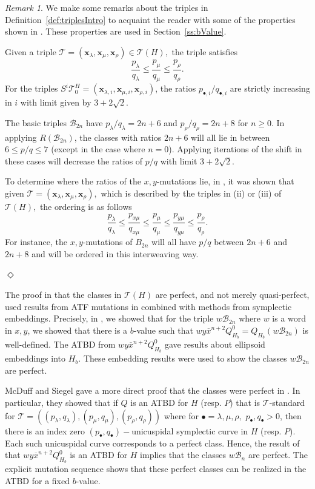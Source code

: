 \documentclass[11pt, reqno]{amsart}
\theoremstyle{remark}
\numberwithin{equation}{subsection}
\numberwithin{figure}{section}
\theoremstyle{customremark}
\newtheorem{rmk_no_diamond}[thm]{Remark}
\newenvironment{rmk}{\begin{rmk_no_diamond} } {\hfill$\er$ \end{rmk_no_diamond}}
\newcommand{\Tt}{\mathcal{T}}
\newcommand{\ov}{\overline}
\newcommand{\la}{{\lambda}}
\newcommand{\er}{{\Diamond}}
\newcommand{\T}{\mathcal{T}}
\begin{document}
\begin{rmk}\label{rmk:Ordering}
    We make some remarks about the triples in Definition~\ref{def:triplesIntro} to acquaint the reader with some of the properties shown in \cite{MMW}. These properties are used in Section~\ref{ss:bValue}.

    Given a triple $\Tt=(\bm{x}_\la,\bm{x}_\mu,\bm{x}_\rho) \in \T(H),$ the triple satisfies
    \[ \frac{p_\la}{q_\la} \leq \frac{p_\mu}{q_\mu} \leq \frac{p_\rho}{q_\rho}.\]
    For the triples $S^i\Tt_0^H=(\bm{x}_{\la,i},\bm{x}_{\mu,i},\bm{x}_{\rho,i})$, the ratios $p_{\bullet,i}/q_{\bullet,i}$ are strictly increasing in $i$ with limit given by $3+2\sqrt{2}.$
    
    
    The basic triples $\mathcal{B}_{2n}$ have $p_\la/q_\la=2n+6$ and $p_\rho/q_\rho=2n+8$ for $n \geq 0$. In applying $R(\mathcal{B}_{2n})$, the classes with ratios $2n+6$ will all lie in between $6 \leq p/q \leq 7$ (except in the case where $n=0$). Applying iterations of the shift in these cases will decrease the ratios of $p/q$ with limit $3+2\sqrt{2}.$
    
    To determine where the ratios of the $x,y$-mutations lie, in \cite{MMW}, it was shown that given $\Tt=(\bm{x}_\la,\bm{x}_\mu,\bm{x}_\rho),$ which is described by the triples in (ii) or (iii) of $\T(H),$ the ordering is as follows
    \[ \frac{p_\la}{q_\la} \leq \frac{p_{x\mu}}{q_{x\mu}} \leq \frac{p_\mu}{q_\mu} \leq \frac{p_{y\mu}}{q_{y\mu}} \leq \frac{p_\rho}{q_\rho}.\]
    For instance, the $x,y$-mutations of $B_{2n}$ will all have $p/q$ between $2n+6$ and $2n+8$ and will be ordered in this interweaving way. 
   
\end{rmk}
 

The proof in \cite{MMW} that the classes in $\T(H)$ are perfect, and not merely quasi-perfect, used results from ATF mutations in \cite{M1} combined with methods from symplectic embeddings. Precisely, in \cite{M1}, we showed that for the triple $w\mathcal{B}_{2n}$ where $w$ is a word in $x,y$, we showed that there is a $b$-value such that $wy\ov{x}^{n+2}Q_{H_b}^0=Q_{H_b}(w\mathcal{B}_{2n})$ is well-defined. The ATBD from $wy\ov{x}^{n+2}Q_{H_b}^0$ gave results about ellipsoid embeddings into $H_b$. These embedding results were used to show the classes $w\mathcal{B}_{2n}$ are perfect. 

McDuff and Siegel gave a more direct proof that the classes were perfect in \cite{McSi}. In particular, they showed that if $Q$ is an ATBD for $H$ (resp. $P$) that is $\Tt$-standard for $\Tt=((p_\la,q_\la),(p_\mu,q_\mu),(p_\rho,q_\rho))$ where for $\bullet=\la,\mu,\rho,$ $p_\bullet,q_\bullet>0$, then there is an index zero $(p_\bullet,q_\bullet)-$unicuspidal symplectic curve in $H$ (resp. $P$). Each such unicuspidal curve corresponds to a perfect class. Hence, the result of \cite{M1} that $wy\ov{x}^{n+2}Q_{H_b}^0$ is an ATBD for $H$ implies that the classes $w\mathcal{B}_n$ are perfect. The explicit mutation sequence shows that these perfect classes can be realized in the ATBD for a fixed $b$-value. 
\end{document}
